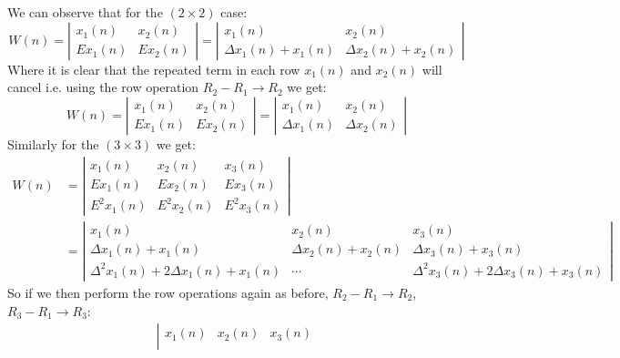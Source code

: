 \documentclass[12pt,letterpaper]{article}
\theoremstyle{definition}
\begin{document}
\begin{changemargin}{.5cm}{0cm}
We can observe that for the $(2\times2)$ case:
\begin{equation*}
    W(n) = \left|\begin{matrix}
        x_1(n) & x_2(n)  \\
        Ex_1(n) & Ex_2(n) 
    \end{matrix}\right|= \left|\begin{matrix}
        x_1(n) & x_2(n)  \\
        \Delta x_1(n)+x_1(n) & \Delta x_2(n) +x_2(n)
    \end{matrix}\right|
\end{equation*}
Where it is clear that the repeated term in each row $x_1(n)$ and $x_2(n)$ will cancel i.e. using the row operation $R_2-R_1 \rightarrow R_2$ we get: 
\begin{equation*}
    W(n) = \left|\begin{matrix}
        x_1(n) & x_2(n)  \\
        Ex_1(n) & Ex_2(n) 
    \end{matrix}\right|= \left|\begin{matrix}
        x_1(n) & x_2(n)  \\
        \Delta x_1(n) & \Delta x_2(n) 
    \end{matrix}\right|
\end{equation*}
Similarly for the $(3\times3)$ we get: \begin{align*}
    W(n) &= \left|\begin{matrix}
        x_1(n) & x_2(n) & x_3(n) \\
        Ex_1(n) & Ex_2(n) & Ex_3(n)\\
        E^2x_1(n) & E^2x_2(n) & E^2x_3(n)
    \end{matrix}\right|\\
    &= \left|\begin{matrix}
         x_1(n) & x_2(n) & x_3(n) \\
        \Delta x_1(n) + x_1(n) & \Delta x_2(n)+ x_2(n) & \Delta x_3(n)+ x_3(n)\\
        \Delta^2 x_1(n)+ 2\Delta x_1(n) + x_1(n) & \cdots & \Delta^2 x_3(n)+ 2\Delta x_3(n) + x_3(n)
    \end{matrix}\right|
\end{align*}
So if we then perform the row operations again as before, $R_2-R_1 \rightarrow R_2$, $R_3-R_1 \rightarrow R_3$:
\begin{align*}
    \left|\begin{matrix}
         x_1(n) & x_2(n) & x_3(n) \\

\end{matrix}
\end{align*}
\end{changemargin}
\end{document}
